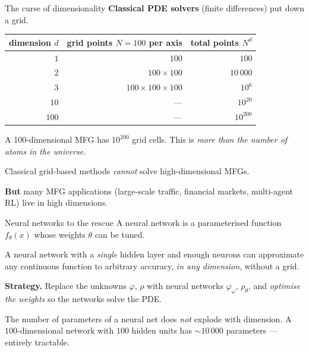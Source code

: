 \documentclass[10pt,aspectratio=169]{beamer}
\newcommand{\blue}[1]{\textcolor{kaustblue}{#1}}
\newcommand{\citehl}[1]{\textcolor{kaustblue!80!black}{\textbf{[#1]}}}
\begin{document}
\begin{frame}{The curse of dimensionality}
\textbf{Classical PDE solvers} (finite differences) put down a grid.

\smallskip
\begin{center}
\begin{tabular}{rrr}
\toprule
dimension $d$ & grid points $N=100$ per axis & total points $N^d$ \\
\midrule
$1$  & $100$       & $100$ \\
$2$  & $100\times 100$ & $10\,000$ \\
$3$  & $100\times100\times100$ & $10^6$ \\
$10$ & ---         & $10^{20}$ \\
$100$& ---         & \alert{$10^{200}$} \\
\bottomrule
\end{tabular}
\end{center}

\medskip
A 100-dimensional MFG has \alert{$10^{200}$} grid cells.
This is \emph{more than the number of atoms in the universe}.

\medskip
\begin{idea}[title=Curse of dimensionality]
Classical grid-based methods \emph{cannot} solve high-dimensional MFGs.
\end{idea}

\medskip
\textbf{But} many MFG applications (large-scale traffic, financial markets,
multi-agent RL) live in high dimensions.
\end{frame}

\begin{frame}{Neural networks to the rescue}
A \blue{neural network} is a parameterised function $f_\theta(x)$
whose weights $\theta$ can be tuned.

\medskip
\begin{idea}[title=Universal Approximation Theorem (\citehl{Hornik 1991})]
A neural network with a \emph{single} hidden layer and enough neurons
can approximate any continuous function to arbitrary accuracy,
\emph{in any dimension}, without a grid.
\end{idea}

\medskip
\textbf{Strategy.}  Replace the unknowns $\varphi$, $\rho$ with neural
networks $\varphi_\omega$, $\rho_\theta$, and \emph{optimise the weights}
so the networks solve the PDE.

\medskip
The number of parameters of a neural net does \emph{not} explode
with dimension. A $100$-dimensional network with $100$ hidden units has
$\sim 10\,000$ parameters --- entirely tractable.
\end{frame}
\end{document}
